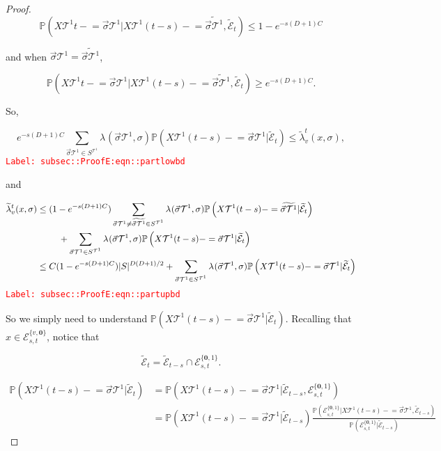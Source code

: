 \documentclass[12pt]{article}
\newcommand{\mb}{\mathbb}
\newcommand{\mc}{\mathcal}
\newcommand{\tr}{\textcolor{red}}
\newcommand{\labe}[1]{\tr{\texttt{Label: #1}}}
\newcommand{\pr}{\mb{P}}							%
\renewcommand{\root}{\mathbf{0}}				%
\renewcommand{\v}{v}							%
\renewcommand{\S}{S}							%
\newcommand{\s}{\sigma}							%
\newcommand{\sv}{\vec{\s}}						%
\newcommand{\x}{x}								%
\renewcommand{\t}{t}							%
\renewcommand{\tt}{s}							%
\newcommand{\X}{X}								%
\newcommand{\const}{C}							%
\newcommand{\degr}{D}							%
\newcommand{\tree}{\mc{T}}						%
\newcommand{\sln}[1]{^{#1}}						%
\newcommand{\XState}[1]{\S^{#1}}				%
\newcommand{\rate}[1]{\lambda_{#1}}					%
\newcommand{\crate}[2]{\alt{\lambda}_{#1}^{#2}}		%
\newcommand{\alt}{\widetilde}						%
\newcommand{\evnt}{\mc{E}}						%
\begin{document}
\begin{proof}
\[\pr\left(\X{\tree\sln{1}}{\t-} = \sv{}{\tree\sln{1}}|\X{\tree\sln{1}}{(\t-\tt)-}=\alt{\sv{}{\tree\sln{1}}},\alt{\evnt}_\t\right) \leq 1-e^{-\tt(\degr+1)\const{}}\]

and when \(\sv{}{\tree\sln{1}}=\alt{\sv{}{\tree\sln{1}}}\),

\[\pr\left(\X{\tree\sln{1}}{\t-} = \sv{}{\tree\sln{1}}|\X{\tree\sln{1}}{(\t-\tt)-}=\alt{\sv{}{\tree\sln{1}}},\alt{\evnt}_\t\right) \geq e^{-\tt(\degr+1)\const{}}.\]

So,

\begin{equation}
e^{-\tt(\degr+1)\const{}}\sum_{\sv{}{\tree\sln{1}}\in \S^{\tree\sln{1}}} \rate{}(\sv{}{\tree\sln{1}},\s)\pr\left(\X{\tree\sln{1}}{(\t-\tt)-}=\sv{}{\tree\sln{1}}|\alt{\evnt}_\t\right) \leq \crate{\v}{\t}(\x{}{},\s),
\label{subsec::ProofE:eqn::partlowbd}
\end{equation}
\labe{subsec::ProofE:eqn::partlowbd}

and

\begin{align}
\crate{\v}{\t}(\x{}{},\s)&\leq (1 - e^{-\tt(\degr+1)\const{}})\sum_{\sv{}{\tree\sln{1}}\neq \alt{\sv{}{\tree\sln{1}}} \in \S^{\tree\sln{1}}} \rate{}(\sv{}{\tree\sln{1}},\s)\pr\left(\X{\tree\sln{1}}{(\t-\tt)-}=\alt{\sv{}{\tree\sln{1}}}|\alt{\evnt}_\t\right)\nonumber\\
&\hspace{24 pt} +\sum_{\sv{}{\tree\sln{1}} \in \S^{\tree\sln{1}}} \rate{}(\sv{}{\tree\sln{1}},\s)\pr\left(\X{\tree\sln{1}}{(\t-\tt)-}=\sv{}{\tree\sln{1}}|\alt{\evnt}_\t\right)\nonumber\\
&\leq \const{}(1 - e^{-\tt(\degr+1)\const{}})|\S|^{\degr(\degr+1)/2} + \sum_{\sv{}{\tree\sln{1}} \in \S^{\tree\sln{1}}} \rate{}(\sv{}{\tree\sln{1}},\s)\pr\left(\X{\tree\sln{1}}{(\t-\tt)-}=\sv{}{\tree\sln{1}}|\alt{\evnt}_\t\right)
\label{subsec::ProofE:eqn::partupbd}
\end{align}
\labe{subsec::ProofE:eqn::partupbd}

So we simply need to understand \(\pr\left(\X{\tree\sln{1}}{(\t-\tt)-}=\sv{}{\tree\sln{1}}|\alt{\evnt}_\t\right)\). Recalling that \(\x{}{} \in \evnt^{\{\v,\root\}}_{\tt,\t}\), notice that

\[\alt{\evnt}_\t = \alt{\evnt}_{\t-\tt}\cap \evnt^{\{\root,1\}}_{\tt,\t}.\]

\begin{align*}
\pr\left(\X{\tree\sln{1}}{(\t-\tt)-}=\sv{}{\tree\sln{1}}|\alt{\evnt}_\t\right) &= \pr\left(\X{\tree\sln{1}}{(\t-\tt)-}=\sv{}{\tree\sln{1}}|\alt{\evnt}_{\t-\tt},\evnt^{\{\root,1\}}_{\tt,\t}\right)\\
&=\pr\left(\X{\tree\sln{1}}{(\t-\tt)-}=\sv{}{\tree\sln{1}}|\alt{\evnt}_{\t-\tt}\right)\frac{\pr\left(\evnt^{\{\root,1\}}_{\tt,\t}|\X{\tree\sln{1}}{(\t-\tt)-}=\sv{}{\tree\sln{1}},\alt{\evnt}_{\t-\tt}\right)}{\pr\left(\evnt^{\{\root,1\}}_{\tt,\t}|\alt{\evnt}_{\t-\tt}\right)}
\end{align*}


\end{proof}
\end{document}
